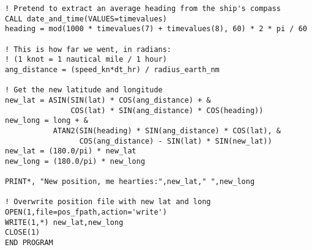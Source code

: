 \begin{lstlisting}[columns=fullflexible,basicstyle=\small]
! Pretend to extract an average heading from the ship's compass
CALL date_and_time(VALUES=timevalues)
heading = mod(1000 * timevalues(7) + timevalues(8), 60) * 2 * pi / 60

! This is how far we went, in radians:
! (1 knot = 1 nautical mile / 1 hour)
ang_distance = (speed_kn*dt_hr) / radius_earth_nm

! Get the new latitude and longitude
new_lat = ASIN(SIN(lat) * COS(ang_distance) + &
               COS(lat) * SIN(ang_distance) * COS(heading))
new_long = long + &
           ATAN2(SIN(heading) * SIN(ang_distance) * COS(lat), &
                 COS(ang_distance) - SIN(lat) * SIN(new_lat))
new_lat = (180.0/pi) * new_lat
new_long = (180.0/pi) * new_long

PRINT*, "New position, me hearties:",new_lat," ",new_long

! Overwrite position file with new lat and long
OPEN(1,file=pos_fpath,action='write')
WRITE(1,*) new_lat,new_long
CLOSE(1)
END PROGRAM
\end{lstlisting}

